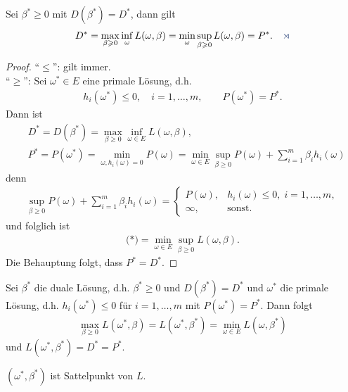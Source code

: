 \begin{cor*}
Sei $\beta^*\ge 0$ mit $D(\beta^*) = D^*$, dann gilt
\begin{align*}
D^* = \max_{\beta \ge 0} \inf_{\omega} L(\omega,\beta) = \min_{\omega}
\sup_{\beta \ge 0} L(\omega,\beta) = P^*.\fishhere
\end{align*}
\end{cor*}
\begin{proof}
"`$\le$"': gilt immer.\\
"`$\ge$"': Sei $\omega^*\in E$ eine primale Lösung, d.h.
\begin{align*}
h_i(\omega^*)\le 0,\quad i=1,\ldots,m,\qquad P(\omega^*) = P^*.
\end{align*}
Dann ist
\begin{align*}
&D^* = D(\beta^*) = \max_{\beta\ge 0}\inf_{\omega\in E}L(\omega,\beta),\\
&P^* = P(\omega^*) = \min_{\omega, h_i(\omega) = 0}
P(\omega) = \min_{\omega\in E} \sup_{\beta \ge 0} P(\omega) + \sum_{i=1}^m
\beta_i h_i(\omega)\tag{*}
\end{align*}
denn
\begin{align*}
\sup_{\beta \ge 0} P(\omega) + \sum_{i=1}^m \beta_i h_i(\omega) =
\begin{cases}
P(\omega), & h_i(\omega) \le 0,\; i=1,\ldots,m,\\
\infty, & \text{sonst}.
\end{cases}
\end{align*}
und folglich ist
\begin{align*}
\text{(*)} = \min_{\omega\in E}\sup_{\beta\ge 0} L(\omega,\beta).
\end{align*}
Die Behauptung folgt, dass $P^*=D^*$.\qedhere
\end{proof}

\begin{prop*}
Sei $\beta^*$ die duale Lösung, d.h. $\beta^*\ge 0$ und $D(\beta^*)= D^*$ und
$\omega^*$ die primale Lösung, d.h. $h_i(\omega^*) \le 0$ für $i=1,\ldots,m$
mit $P(\omega^*) = P^*$.
Dann folgt
\begin{align*}
\max_{\beta \ge 0} L(\omega^*,\beta) = L(\omega^*,\beta^*) = \min_{\omega\in E}
L(\omega, \beta^*)
\end{align*}
und $L(\omega^*,\beta^*) = D^*= P^*$.\fishhere
\end{prop*}

$(\omega^*,\beta^*)$ ist Sattelpunkt von $L$.

